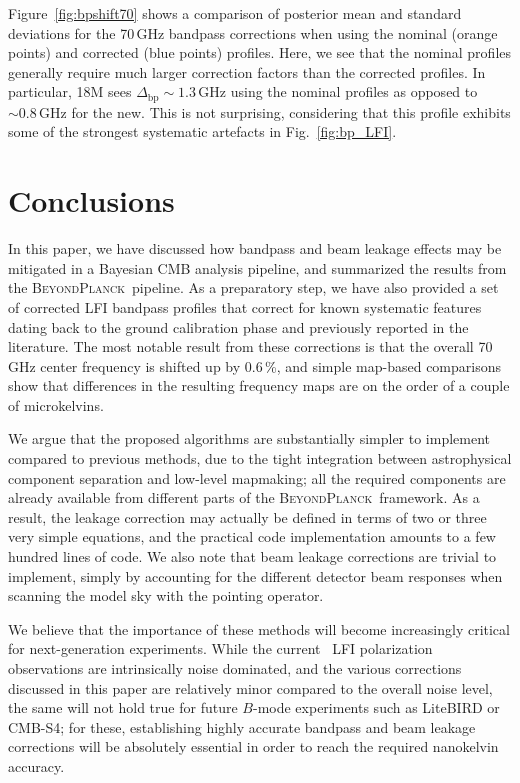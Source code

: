 \documentclass[twocolumn]{aa}
\newcommand{\Dbp}[0]{\Delta_{\mathrm{bp}}}
\newcommand{\BP}{\textsc{BeyondPlanck}}
\newcommand{\?}[1]{\textcolor{red}{{\bf [#1]}}}
\begin{document}
Figure~\ref{fig:bpshift70} shows a comparison of posterior mean and
standard deviations for the 70\,GHz bandpass corrections when using
the nominal (orange points) and corrected (blue points)
profiles. Here, we see that the nominal profiles generally require
much larger correction factors than the corrected profiles. In
particular, 18M sees $\Dbp\sim1.3$\,GHz using the nominal profiles as
opposed to $\sim0.8\,$GHz for the new. This is not surprising,
considering that this profile exhibits some of the strongest
systematic artefacts in Fig.~\ref{fig:bp_LFI}. 

\section{Conclusions}
\label{sec:conclusion}

In this paper, we have discussed how bandpass and beam leakage effects may be
mitigated in a Bayesian CMB analysis pipeline, and summarized the results from
the \BP\ pipeline. As a preparatory step, we have also provided a set of
corrected LFI bandpass profiles that correct for known systematic features
dating back to the ground calibration phase and previously reported in the
literature. The most notable result from these corrections is that the overall
70\,GHz center frequency is shifted up by 0.6\,\%, and simple map-based
comparisons show that differences in the resulting frequency maps are on the
order of a couple of microkelvins. 

We argue that the proposed algorithms are substantially simpler to implement
compared to previous methods, due to the tight integration between astrophysical
component separation and low-level mapmaking; all the required components are
already available from different parts of the \BP\ framework. As a result, the
leakage correction may actually be defined in terms of two or three very simple
equations, and the practical code implementation amounts to a few hundred lines
of code. We also note that beam leakage corrections are trivial to implement,
simply by accounting for the different detector beam responses when scanning the
model sky with the pointing operator.

We believe that the importance of these methods will become increasingly
critical for next-generation experiments. While the current \Planck\ LFI
polarization observations are intrinsically noise dominated, and the various
corrections discussed in this paper are relatively minor compared to the overall
noise level, the same will not hold true for future $B$-mode experiments such as
LiteBIRD or CMB-S4; for these, establishing highly accurate bandpass and beam
leakage corrections will be absolutely essential in order to reach the required
nanokelvin accuracy.






\end{document}
